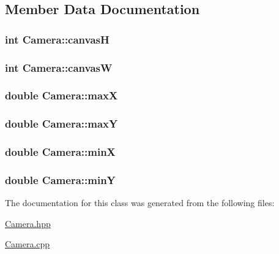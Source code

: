 \subsection{Member Data Documentation}
\hypertarget{classCamera_a2619e7d4b8a7bdb7fc67b51505b0e6a8}{
\subsubsection[{canvas\+H}]{\setlength{\rightskip}{0pt plus 5cm}int Camera\+::canvas\+H}}\label{classCamera_a2619e7d4b8a7bdb7fc67b51505b0e6a8}
\hypertarget{classCamera_a6ca24505b375d8d57e6546e914e04d29}{
\subsubsection[{canvas\+W}]{\setlength{\rightskip}{0pt plus 5cm}int Camera\+::canvas\+W}}\label{classCamera_a6ca24505b375d8d57e6546e914e04d29}
\hypertarget{classCamera_af42e7430e117c722c7aa5cead313f397}{
\subsubsection[{max\+X}]{\setlength{\rightskip}{0pt plus 5cm}double Camera\+::max\+X}}\label{classCamera_af42e7430e117c722c7aa5cead313f397}
\hypertarget{classCamera_ae104c15edb75338f548b1a0a516f90bb}{
\subsubsection[{max\+Y}]{\setlength{\rightskip}{0pt plus 5cm}double Camera\+::max\+Y}}\label{classCamera_ae104c15edb75338f548b1a0a516f90bb}
\hypertarget{classCamera_a27d1b830bae98aa1641a663535449e58}{
\subsubsection[{min\+X}]{\setlength{\rightskip}{0pt plus 5cm}double Camera\+::min\+X}}\label{classCamera_a27d1b830bae98aa1641a663535449e58}
\hypertarget{classCamera_a3f0be429896f178761bf5849de48026c}{
\subsubsection[{min\+Y}]{\setlength{\rightskip}{0pt plus 5cm}double Camera\+::min\+Y}}\label{classCamera_a3f0be429896f178761bf5849de48026c}


The documentation for this class was generated from the following files\+:\begin{DoxyCompactItemize}
\item 
\hyperlink{Camera_8hpp}{Camera.\+hpp}\item 
\hyperlink{Camera_8cpp}{Camera.\+cpp}\end{DoxyCompactItemize}
